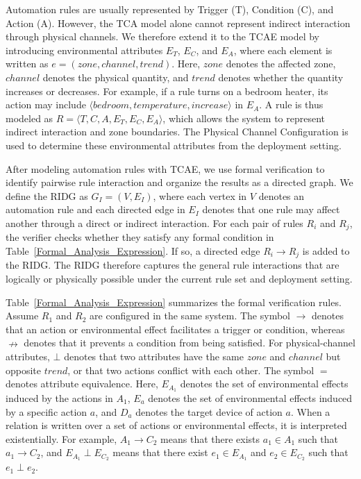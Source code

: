 Automation rules are usually represented by Trigger (T), Condition (C), and Action (A). However, the TCA model alone cannot represent indirect interaction through physical channels. We therefore extend it to the TCAE model by introducing environmental attributes $E_T$, $E_C$, and $E_A$, where each element is written as $e=(zone, channel, trend)$. Here, $zone$ denotes the affected zone, $channel$ denotes the physical quantity, and $trend$ denotes whether the quantity increases or decreases. For example, if a rule turns on a bedroom heater, its action may include $\langle bedroom, temperature, increase \rangle$ in $E_A$. A rule is thus modeled as $R=\langle T, C, A, E_T, E_C, E_A \rangle$, which allows the system to represent indirect interaction and zone boundaries. The Physical Channel Configuration is used to determine these environmental attributes from the deployment setting.

After modeling automation rules with TCAE, we use formal verification to identify pairwise rule interaction and organize the results as a directed graph. We define the RIDG as $G_I=(V,E_I)$, where each vertex in $V$ denotes an automation rule and each directed edge in $E_I$ denotes that one rule may affect another through a direct or indirect interaction. For each pair of rules $R_i$ and $R_j$, the verifier checks whether they satisfy any formal condition in Table~\ref{Formal_Analysis_Expression}. If so, a directed edge $R_i \rightarrow R_j$ is added to the RIDG. The RIDG therefore captures the general rule interactions that are logically or physically possible under the current rule set and deployment setting.

Table~\ref{Formal_Analysis_Expression} summarizes the formal verification rules. Assume $R_1$ and $R_2$ are configured in the same system. The symbol $\rightarrow$ denotes that an action or environmental effect facilitates a trigger or condition, whereas $\nrightarrow$ denotes that it prevents a condition from being satisfied. For physical-channel attributes, $\bot$ denotes that two attributes have the same $zone$ and $channel$ but opposite $trend$, or that two actions conflict with each other. The symbol $=$ denotes attribute equivalence. Here, $E_{A_1}$ denotes the set of environmental effects induced by the actions in $A_1$, $E_a$ denotes the set of environmental effects induced by a specific action $a$, and $D_a$ denotes the target device of action $a$. When a relation is written over a set of actions or environmental effects, it is interpreted existentially. For example, $A_1 \rightarrow C_2$ means that there exists $a_1 \in A_1$ such that $a_1 \rightarrow C_2$, and $E_{A_1} \perp E_{C_2}$ means that there exist $e_1 \in E_{A_1}$ and $e_2 \in E_{C_2}$ such that $e_1 \perp e_2$.

